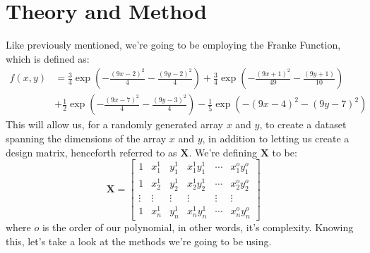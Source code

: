 \documentclass{article}
\begin{document}
\section{Theory and Method}
Like previously mentioned, we're going to be employing the Franke Function, which is defined as:
\begin{align*}
f(x,y) &= \frac{3}{4}\exp{\left(-\frac{(9x-2)^2}{4} - \frac{(9y-2)^2}{4}\right)}+\frac{3}{4}\exp{\left(-\frac{(9x+1)^2}{49}- \frac{(9y+1)}{10}\right)} \\
&+\frac{1}{2}\exp{\left(-\frac{(9x-7)^2}{4} - \frac{(9y-3)^2}{4}\right)} -\frac{1}{5}\exp{\left(-(9x-4)^2 - (9y-7)^2\right)} 
\end{align*}
\newline
This will allow us, for a randomly generated array $x$ and $y$, to create a dataset spanning the dimensions of the array $x$ and $y$, in addition to letting us create a design matrix, henceforth referred to as $\mathbf{X}$. We're defining $\mathbf{X}$ to be:
\begin{equation*} \mathbf{X} = 
    \begin{bmatrix} 1& x_1^1& y_1^1& x_1^1y_1^1& \cdots& x_1^oy_1^o \\
    1 & x_2^1& y_2^1& x_2^1y_2^1& \cdots& x_2^oy_2^o \\
    \vdots& \vdots& \vdots& \vdots& \vdots& \vdots \\
    1& x_n^1& y_n^1& x_n^1y_n^1& \cdots& x_n^oy_n^o
    \end{bmatrix} 
                                 
\label{eq:matrixse} 
\end{equation*}
\newline
where $o$ is the order of our polynomial, in other words, it's complexity. Knowing this, let's take a look at the methods we're going to be using.
\end{document}
